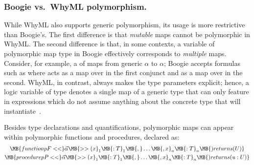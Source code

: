 \documentclass[a4paper,final]{llncs}
\newif\iflong
\newcommand{\Boogie}{Boogie\xspace}
\newcommand{\WhyML}{WhyML\xspace}
\newcommand{\Why}{Why3\xspace}
\begin{document}
\subsubsection{\Boogie vs.\ \WhyML polymorphism.}
While \WhyML also supports generic polymorphism\iflong, like every functional language in the ML family to which it belongs\fi{}, its usage is more restrictive than \Boogie's.
The first difference is that \emph{mutable} maps cannot be polymorphic in \WhyML\iflong; therefore, \Boogie variables of polymorphic map type require a special translation\fi.
The second difference is that, in some contexts, a variable of polymorphic map type in \Boogie effectively corresponds to \emph{multiple} maps\iflong, one for each possible concrete type, and the different maps can be combined in the same expression\fi.
Consider, for example, a 
 of maps from generic\iflong{} type\fi{} $\alpha$ to $\alpha$; \Boogie accepts formulas such as  where  acts as a map over  in the first conjunct and as a map over  in the second\iflong conjunct\fi.
\WhyML, in contrast, always makes the type parameters explicit; hence, a logic variable of type  denotes a single map of a generic type that can only feature in expressions which do not assume anything about the concrete type that will instantiate~.
{}\iflong
Note that \Boogie even allows expressions that introduce inconsistencies, such as \B{forall <<\\beta>> x: \\beta, y: Mix :: y[x] == 3 && y[x] == true} (where the quantification is also type-generic), which passes typechecking but allows one to derive false.
\fi

Besides type declarations and quantifications, polymorphic maps can appear within polymorphic functions and procedures, declared as: 
\begin{gather}
\MB{function pF<<}\vec{\alpha}\MB{>>(x}_1\MB{: T}_1\MB{,} \ldots \MB{,x}_n\MB{: T}_n\MB{) returns (U)}
\label{eq:def-poly-fun} \\
\MB{procedure pP<<}\vec{\alpha}\MB{>>(x}_1\MB{: T}_1\MB{,} \ldots \MB{,x}_n\MB{: T}_n\MB{) returns (u: U)}
\label{eq:def-poly-proc}
\end{gather}
\iflong
Precisely, two kinds of polymorphic maps may feature within polymorphic functions and procedures: polymorphic maps generic with respect to \emph{explicitly declared} function or procedure parameters are similar to \Why's, and hence different from those generic with respect to implicit type parameters declared outside the function or procedure.
For example, implementations of a procedure \B{p<<\\beta>>(m: Mix, n: [\\beta]\\beta)} can select elements of any concrete type from \B{m}, but only elements of parametric type $\beta$ from \B{n}.
\fi
\end{document}
